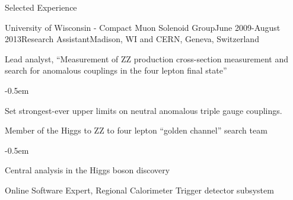 \documentclass{resume} %
\begin{document}
\begin{rSection}{Selected Experience}
\begin{rSubsection}{University of Wisconsin - Compact Muon Solenoid Group}{June
2009-August 2013}{Research Assistant}{Madison, WI and CERN, Geneva, Switzerland}

\item Lead analyst, ``Measurement of ZZ production cross-section measurement and
search for anomalous couplings in the four lepton final state''
    \begin{list}{}{\leftmargin=1.5em} 
      \itemsep -0.5em \vspace{-0.5em} %
      \item Set strongest-ever upper limits on neutral anomalous triple gauge
      couplings.
    \end{list}


\item Member of the Higgs to ZZ to four lepton ``golden channel'' search team
    \begin{list}{}{\leftmargin=1.5em} 
      \itemsep -0.5em \vspace{-0.5em} %
      \item Central analysis in the Higgs boson discovery
    \end{list}

\item Online Software Expert, Regional Calorimeter Trigger detector subsystem



\end{rSubsection}



\end{rSection}
\end{document}
